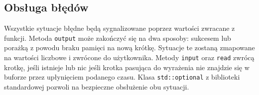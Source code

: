 \documentclass[a4paper]{article}
\begin{document}
	\subsection{Obsługa błędów}
	Wszystkie sytuacje błędne będą sygnalizowane poprzez wartości zwracane z funkcji.
	Metoda \texttt{output} może zakończyć się na dwa sposoby: sukcesem lub porażką z powodu braku pamięci na nową krótkę. Sytuacje te zostaną zmapowane na wartości liczbowe i zwrócone do użytkownika.
	Metody \texttt{input} oraz \texttt{read} zwrócą krotkę, jeśli istnieje lub nic jeśli krotka pasująca do wyrażenia nie znajdzie się w buforze przez upłynięciem podanego czasu. Klasa \texttt{std::optional} z biblioteki standardowej pozwoli na bezpieczne obsłużenie obu sytuacji.
\end{document}
